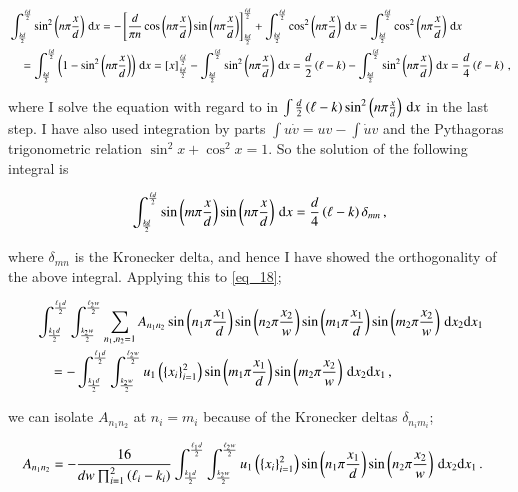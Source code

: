 \documentclass[11pt,english,a4paper]{article}
\begin{document}
\begin{flushleft}
\begin{align*}
&\int_{\frac{k d}{2}}^{\frac{\ell d}{2}} \sin^2\left({n\pi\frac{x}{d}}\right)\,\mathrm{d}x 
= -\left[{ \frac{d}{\pi n}\cos\left({n\pi\frac{x}{d}}\right)\sin\left({n\pi\frac{x}{d}}\right)}\right]_{\frac{k d}{2}}^{\frac{\ell d}{2}} + \int_{\frac{k d}{2}}^{\frac{\ell d}{2}} \cos^2\left({n\pi\frac{x}{d}}\right)\,\mathrm{d}x
= \int_{\frac{k d}{2}}^{\frac{\ell d}{2}}  \cos^2\left({n\pi\frac{x}{d}}\right)\,\mathrm{d}x
\\ 
&\quad = \int_{\frac{k d}{2}}^{\frac{\ell d}{2}}  \left({1-\sin^2\left({n\pi\frac{x}{d}}\right)}\right)\,\mathrm{d}x 
= \left[{x}\right]_{\frac{k d}{2}}^{\frac{\ell d}{2}} - \int_{\frac{k d}{2}}^{\frac{\ell d}{2}}  \sin^2\left({n\pi\frac{x}{d}}\right)\,\mathrm{d}x 
= \frac{d}{2}\left({\ell-k}\right) - \int_{\frac{k d}{2}}^{\frac{\ell d}{2}}  \sin^2\left({n\pi\frac{x}{d}}\right)\,\mathrm{d}x 
= \frac{d}{4}\left({\ell-k}\right) \,,
\end{align*}

where I solve the equation with regard to in $\int\frac{d}{2}\left({\ell-k}\right) \sin^2\left({n\pi\frac{x}{d}}\right)\,\mathrm{d}x$ in the last step. I have also used integration by parts $\int u\dot{v} = uv - \int \dot{u}v$ and the Pythagoras trigonometric relation $\sin^2 x+ \cos^2 x = 1$. So the solution of the following integral is

\begin{align*}
\int_{\frac{k d}{2}}^{\frac{\ell d}{2}} \sin\left({m\pi\frac{x}{d}}\right)\sin\left({n\pi\frac{x}{d}}\right)\,\mathrm{d}x = \frac{d}{4}\left({\ell-k}\right)\delta_{mn}\,,
\end{align*}

where $\delta_{mn}$ is the Kronecker delta, and hence I have showed the orthogonality of the above integral. Applying this to \eqref{eq_18};

\begin{align*}
&\int_{\frac{k_1 d}{2}}^{\frac{\ell_1 d}{2}}\int_{\frac{k_2 w}{2}}^{\frac{\ell_2 w}{2}}  \sum_{n_1,n_2=1}A_{n_1 n_2} \sin\left({n_1\pi \frac{x_1}{d}}\right) \sin\left({n_2\pi \frac{x_2}{w}}\right)\sin\left({m_1\pi\frac{x_1}{d}}\right)\sin\left({m_2\pi\frac{x_2}{w}}\right)\,\mathrm{d}x_2\mathrm{d}x_1 
\\
& \quad = - \int_{\frac{k_1 d}{2}}^{\frac{\ell_1 d}{2}}\int_{\frac{k_2 w}{2}}^{\frac{\ell_2 w}{2}} u_1\left({\left\lbrace{x_i}\right\rbrace_{i=1}^2}\right)\sin\left({m_1\pi\frac{x_1}{d}}\right)\sin\left({m_2\pi\frac{x_2}{w}}\right)\,\mathrm{d}x_2\mathrm{d}x_1\,,
\end{align*}

we can isolate $A_{n_1 n_2}$ at $n_i=m_i$ because of the Kronecker deltas $\delta_{n_i m_i}$;

\begin{align*}
A_{n_1 n_2} &=  - \frac{16}{dw\prod_{i=1}^2\left({\ell_i-k_i}\right)}\int_{\frac{k_1 d}{2}}^{\frac{\ell_1 d}{2}}\int_{\frac{k_2 w}{2}}^{\frac{\ell_2 w}{2}} u_1\left({\left\lbrace{x_i}\right\rbrace_{i=1}^2}\right)\sin\left({n_1\pi\frac{x_1}{d}}\right)\sin\left({n_2\pi\frac{x_2}{w}}\right)\,\mathrm{d}x_2\mathrm{d}x_1 \,.
\end{align*}


\end{flushleft}
\end{document}
